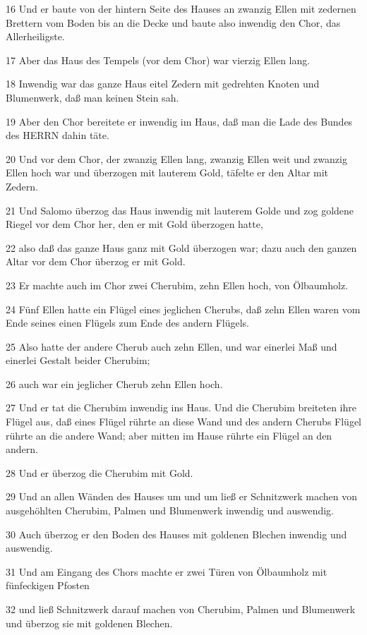 \par 16 Und er baute von der hintern Seite des Hauses an zwanzig Ellen mit zedernen Brettern vom Boden bis an die Decke und baute also inwendig den Chor, das Allerheiligste.
\par 17 Aber das Haus des Tempels (vor dem Chor) war vierzig Ellen lang.
\par 18 Inwendig war das ganze Haus eitel Zedern mit gedrehten Knoten und Blumenwerk, daß man keinen Stein sah.
\par 19 Aber den Chor bereitete er inwendig im Haus, daß man die Lade des Bundes des HERRN dahin täte.
\par 20 Und vor dem Chor, der zwanzig Ellen lang, zwanzig Ellen weit und zwanzig Ellen hoch war und überzogen mit lauterem Gold, täfelte er den Altar mit Zedern.
\par 21 Und Salomo überzog das Haus inwendig mit lauterem Golde und zog goldene Riegel vor dem Chor her, den er mit Gold überzogen hatte,
\par 22 also daß das ganze Haus ganz mit Gold überzogen war; dazu auch den ganzen Altar vor dem Chor überzog er mit Gold.
\par 23 Er machte auch im Chor zwei Cherubim, zehn Ellen hoch, von Ölbaumholz.
\par 24 Fünf Ellen hatte ein Flügel eines jeglichen Cherubs, daß zehn Ellen waren vom Ende seines einen Flügels zum Ende des andern Flügels.
\par 25 Also hatte der andere Cherub auch zehn Ellen, und war einerlei Maß und einerlei Gestalt beider Cherubim;
\par 26 auch war ein jeglicher Cherub zehn Ellen hoch.
\par 27 Und er tat die Cherubim inwendig ins Haus. Und die Cherubim breiteten ihre Flügel aus, daß eines Flügel rührte an diese Wand und des andern Cherubs Flügel rührte an die andere Wand; aber mitten im Hause rührte ein Flügel an den andern.
\par 28 Und er überzog die Cherubim mit Gold.
\par 29 Und an allen Wänden des Hauses um und um ließ er Schnitzwerk machen von ausgehöhlten Cherubim, Palmen und Blumenwerk inwendig und auswendig.
\par 30 Auch überzog er den Boden des Hauses mit goldenen Blechen inwendig und auswendig.
\par 31 Und am Eingang des Chors machte er zwei Türen von Ölbaumholz mit fünfeckigen Pfosten
\par 32 und ließ Schnitzwerk darauf machen von Cherubim, Palmen und Blumenwerk und überzog sie mit goldenen Blechen.
